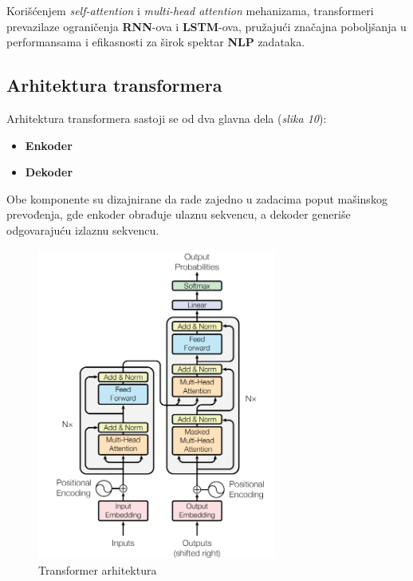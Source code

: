 \documentclass[12pt]{article}
\begin{document}
   Korišćenjem \textit{self-attention} i \textit{multi-head attention} mehanizama, transformeri 
   prevazilaze ograničenja \textbf{RNN}-ova i \textbf{LSTM}-ova, pružajući značajna 
   poboljšanja u performansama i efikasnosti za širok spektar \textbf{NLP} zadataka.

   \subsection{Arhitektura transformera}

   Arhitektura transformera sastoji se od dva glavna dela (\textit{slika 10}):
   \begin{itemize}
      \item \textbf{Enkoder} 
      \item \textbf{Dekoder}
   \end{itemize}
   Obe komponente su dizajnirane da rade zajedno u zadacima poput mašinskog prevođenja, 
   gde enkoder obrađuje ulaznu sekvencu, a dekoder generiše odgovarajuću izlaznu sekvencu. 

   \newpage
   
   \begin{figure}[h!]
      \centering
      \vspace{-1cm} %
      \includegraphics[width=0.7\textwidth]{transformer.png}
      \caption{Transformer arhitektura \cite{attentionneed}}
      \label{fig:transformer}
   \end{figure}
\end{document}
